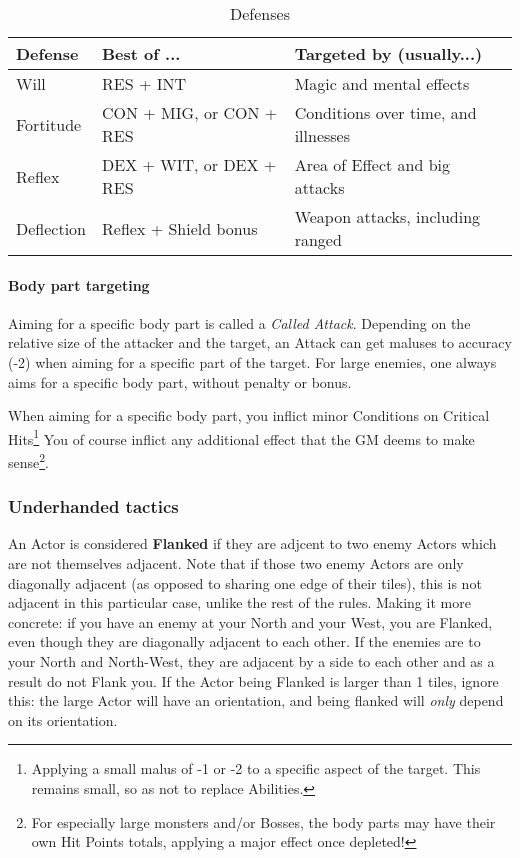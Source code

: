 \begin{table*}[h!tbp]
	\begin{center}
		\begin{tabular}{p{2cm}p{5cm}p{7cm}} \toprule
			
		    \textbf{Defense} & \textbf{Best of ...} & \textbf{Targeted by (usually...)} \\ \midrule

		    Will & RES + INT & Magic and mental effects \\
		    Fortitude & CON + MIG, or CON + RES & Conditions over time, and illnesses \\
		    Reflex & DEX + WIT, or DEX + RES & Area of Effect and big attacks \\
		    Deflection & Reflex + Shield bonus & Weapon attacks, including ranged \\

		    \bottomrule
		\end{tabular}
	\end{center}
	\caption{Defenses}
  \label{defenses_table}
\end{table*}


\paragraph{Body part targeting} 

\label{called_shot}

Aiming for a specific body part is called a \textit{Called Attack}. Depending on the relative size of the attacker and the target, an Attack can get maluses to accuracy (-2) when aiming for a specific part of the target. For large enemies, one always aims for a specific body part, without penalty or bonus.

When aiming for a specific body part, you inflict minor Conditions on Critical Hits\footnote{Applying a small malus of -1 or -2 to a specific aspect of the target. This remains small, so as not to replace Abilities.} You of course inflict any additional effect that the GM deems to make sense\footnote{For especially large monsters and/or Bosses, the body parts may have their own Hit Points totals, applying a major effect once depleted!}.

\subsubsection{Underhanded tactics} 

An Actor is considered \textbf{Flanked} if they are adjcent to two enemy Actors which are not themselves adjacent. Note that if those two enemy Actors are only diagonally adjacent (as opposed to sharing one edge of their tiles), this is not adjacent in this particular case, unlike the rest of the rules. Making it more concrete: if you have an enemy at your North and your West, you are Flanked, even though they are diagonally adjacent to each other. If the enemies are to your North and North-West, they are adjacent by a side to each other and as a result do not Flank you. If the Actor being Flanked is larger than 1 tiles, ignore this: the large Actor will have an orientation, and being flanked will \textit{only} depend on its orientation. 

